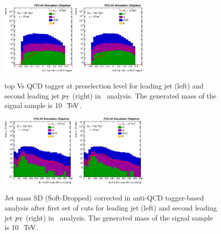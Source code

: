 \begin{figure}[!htb]\centering
\includegraphics[width=0.32\textwidth]{Fig/Zptt/Jet1_thad_vs_QCD_tagger_sel0_nostack_log.eps}
\includegraphics[width=0.32\textwidth]{Fig/Zptt/Jet2_thad_vs_QCD_tagger_sel0_nostack_log.eps}
\caption{top Vs QCD tagger at preselection level for leading jet (left) and second leading jet $p\sb{\scriptstyle\mathrm{T}}$ (right) in \zptt\ analysis. The generated mass of the signal sample is 10 $\TeV$.}
\label{fig:Zptt_sel0_tagger}
\end{figure}

\begin{figure}[!htb]\centering
\includegraphics[width=0.32\textwidth]{Fig/Zptt/Jet1_trk02_SD_Cor_m_sel3_nostack_log.eps}
\includegraphics[width=0.32\textwidth]{Fig/Zptt/Jet2_trk02_SD_Cor_m_sel3_nostack_log.eps}
\caption{Jet mass SD (Soft-Dropped) corrected in anti-QCD tagger-based analysis after first set of cuts for leading jet (left) and second leading jet $p\sb{\scriptstyle\mathrm{T}}$ (right) in \zptt\ analysis. The generated mass of the signal sample is 10 $\TeV$.}
\label{fig:Zptt_sel1_tagger}
\end{figure}

